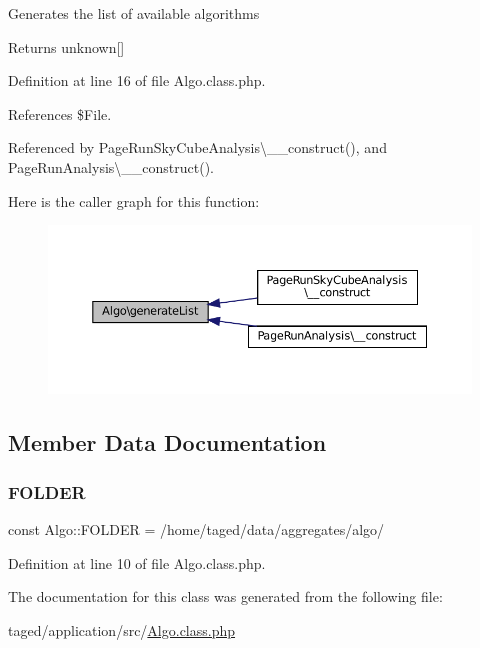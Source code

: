 Generates the list of available algorithms \begin{DoxyReturn}{Returns}
unknown\mbox{[}\mbox{]} 
\end{DoxyReturn}


Definition at line 16 of file Algo.\+class.\+php.



References \$\+File.



Referenced by Page\+Run\+Sky\+Cube\+Analysis\textbackslash{}\+\_\+\+\_\+construct(), and Page\+Run\+Analysis\textbackslash{}\+\_\+\+\_\+construct().

Here is the caller graph for this function\+:\nopagebreak
\begin{figure}[H]
\begin{center}
\leavevmode
\includegraphics[width=350pt]{class_algo_a81c78bf526eab5de7d40d1abdb59557a_icgraph}
\end{center}
\end{figure}


\subsection{Member Data Documentation}
\mbox{\label{class_algo_a0e30fd4650669b4df832624da8a85968}} 
\subsubsection{\texorpdfstring{F\+O\+L\+D\+ER}{FOLDER}}
{\footnotesize\ttfamily const Algo\+::\+F\+O\+L\+D\+ER = \textquotesingle{}/home/taged/data/aggregates/algo/\textquotesingle{}}



Definition at line 10 of file Algo.\+class.\+php.



The documentation for this class was generated from the following file\+:\begin{DoxyCompactItemize}
\item 
taged/application/src/\hyperlink{_algo_8class_8php}{Algo.\+class.\+php}\end{DoxyCompactItemize}
